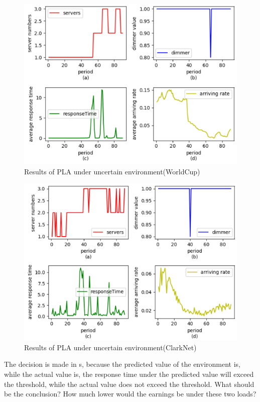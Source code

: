 \documentclass[sigconf]{acmart}
\begin{document}
\begin{figure}[h]
	\centering
	\includegraphics[width=\linewidth]{qnwc}
	\caption{Results of PLA under uncertain environment(WorldCup)}
	
\end{figure}
\begin{figure}[h]
	\centering
	\includegraphics[width=\linewidth]{qncl}
	\caption{Results of PLA under uncertain environment(ClarkNet)}
	
\end{figure}
The decision is made in s, because the predicted value of the environment is, while the actual value is, the response time under the predicted value will exceed the threshold, while the actual value does not exceed the threshold.
What should be the conclusion?
How much lower would the earnings be under these two loads?
\end{document}

